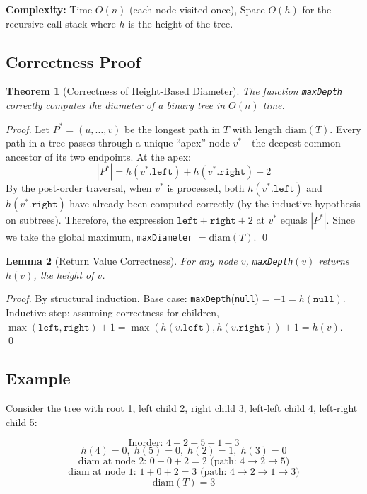 \documentclass[10pt,journal,compsoc,onecolumn]{IEEEtran}
\newtheorem{theorem}{Theorem}
\newtheorem{lemma}[theorem]{Lemma}
\begin{document}
\textbf{Complexity:} Time $O(n)$ (each node visited once), Space $O(h)$ for the recursive call stack where $h$ is the height of the tree.

\subsection{Correctness Proof}

\begin{theorem}[Correctness of Height-Based Diameter]
The function \texttt{maxDepth} correctly computes the diameter of a binary tree in $O(n)$ time.
\end{theorem}

\begin{proof}
Let $P^* = (u, \ldots, v)$ be the longest path in $T$ with length $\text{diam}(T)$. Every path in a tree passes through a unique ``apex'' node $v^*$---the deepest common ancestor of its two endpoints. At the apex:
\[
|P^*| = h(v^*.\texttt{left}) + h(v^*.\texttt{right}) + 2
\]
By the post-order traversal, when $v^*$ is processed, both $h(v^*.\texttt{left})$ and $h(v^*.\texttt{right})$ have already been computed correctly (by the inductive hypothesis on subtrees). Therefore, the expression $\texttt{left} + \texttt{right} + 2$ at $v^*$ equals $|P^*|$. Since we take the global maximum, \texttt{maxDiameter} $= \text{diam}(T)$. \qed
\end{proof}

\begin{lemma}[Return Value Correctness]
For any node $v$, \texttt{maxDepth}$(v)$ returns $h(v)$, the height of $v$.
\end{lemma}

\begin{proof}
By structural induction. Base case: \texttt{maxDepth}(\texttt{null}) = $-1 = h(\texttt{null})$. Inductive step: assuming correctness for children, $\max(\texttt{left}, \texttt{right}) + 1 = \max(h(v.\texttt{left}), h(v.\texttt{right})) + 1 = h(v)$. \qed
\end{proof}

\subsection{Example}

Consider the tree with root 1, left child 2, right child 3, left-left child 4, left-right child 5:

\[
\text{Inorder: } 4 - 2 - 5 - 1 - 3
\]
\[
h(4) = 0,\; h(5) = 0,\; h(2) = 1,\; h(3) = 0
\]
\[
\text{diam at node 2: } 0 + 0 + 2 = 2 \text{ (path: } 4 \to 2 \to 5\text{)}
\]
\[
\text{diam at node 1: } 1 + 0 + 2 = 3 \text{ (path: } 4 \to 2 \to 1 \to 3\text{)}
\]
\[
\text{diam}(T) = 3
\]
\end{document}
